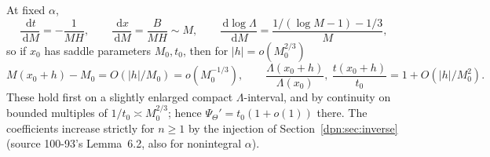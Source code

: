 \documentclass[11pt]{article}
\numberwithin{equation}{section}
\theoremstyle{definition}\newtheorem{definition}[theorem]{Definition}
\theoremstyle{remark}\newtheorem{remark}[theorem]{Remark}
\newcommand{\dd}{\,\mathrm d}\newcommand{\ii}{\mathrm i}
\begin{document}
At fixed $\alpha$,
\begin{equation}\label{dpn:ct:eq:windowderivs}
 \frac{\dd t}{\dd M}=-\frac1{MH},\qquad
 \frac{\dd x}{\dd M}=\frac B{MH}\sim M,\qquad
 \frac{\dd\log\Lambda}{\dd M}=\frac{1/(\log M-1)-1/3}M,
\end{equation}
so if $x_0$ has saddle parameters $M_0,t_0$, then for $|h|=o(M_0^{2/3})$
\begin{equation}\label{dpn:ct:eq:windowM}
 M(x_0+h)-M_0=O(|h|/M_0)=o(M_0^{-1/3}),\qquad
 \frac{\Lambda(x_0+h)}{\Lambda(x_0)},\ \frac{t(x_0+h)}{t_0}=1+O(|h|/M_0^2).
\end{equation}
These hold first on a slightly enlarged compact $\Lambda$-interval, and by
continuity on bounded multiples of $1/t_0\asymp M_0^{2/3}$; hence
$\Psi_\Theta'=t_0(1+o(1))$ there.  The coefficients increase strictly for
$n\ge1$ by the injection of Section~\ref{dpn:sec:inverse} (source 100-93's
Lemma~6.2, also for nonintegral $\alpha$).
\end{document}
